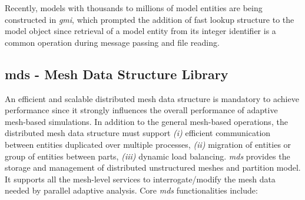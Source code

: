 Recently, models with thousands to millions of model entities are being 
constructed in \emph{gmi}, which prompted the addition of fast lookup 
structure to the model object since retrieval of a model entity from its integer 
identifier is a common operation during message passing and file reading. 

\subsection{mds - Mesh Data Structure Library}\label{sec:pumi_mesh}

An efficient 
and scalable distributed mesh data structure is  mandatory to achieve 
performance since it strongly influences the overall performance of adaptive 
mesh-based simulations. In addition to the general mesh-based operations, the 
distributed mesh data structure must support \emph{(i)} efficient communication 
between entities duplicated over multiple processes, \emph{(ii)} migration of 
entities or group of entities between parts, \emph{(iii)} dynamic load 
balancing. \emph{mds} provides the storage and management of distributed 
unstructured meshes and partition model. It supports all the mesh-level services to interrogate/modify 
the mesh data needed by parallel adaptive analysis. 
Core \emph{mds} functionalities include:

